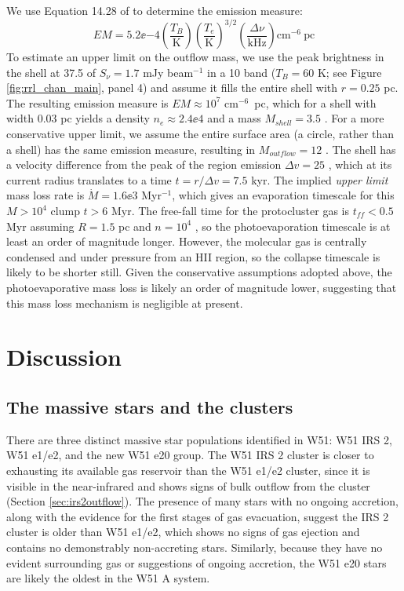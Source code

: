 We use Equation 14.28 of \citet{Wilson2009a} to determine the emission measure:
\begin{equation}
    EM = 5.2\ee{-4} 
    \left(\frac{T_B}{\mathrm{K}}\right)
    \left(\frac{T_e}{\mathrm{K}}\right)^{3/2} \left(\frac{\Delta
    \nu}{\mathrm{kHz}}\right) \mathrm{cm}^{-6}\mathrm{~pc}
\end{equation}
To estimate an upper limit on the outflow mass, we use the peak brightness in the shell at 37.5
\kms of $S_\nu=1.7$ mJy beam$^{-1}$ in a 10 \kms band ($T_B=60$ K;
 see Figure
\ref{fig:rrl_chan_main}, panel 4) and assume it fills the entire shell with
$r=0.25$ pc.  The resulting emission measure is $EM\approx10^7$ cm$^{-6}$~pc,
which for a shell with width 0.03 pc yields a density $n_e\approx2.4\ee{4}$
\percc and a mass $M_{shell}=3.5$ \msun.  For a more conservative upper limit,
we assume the entire surface area (a circle, rather than a shell) has the same
emission measure, resulting in $M_{outflow}=12$ \msun.  The shell has a velocity
difference from the peak of the \hii region emission $\Delta v=25$ \kms, which
at its current radius translates to a time $t = r / \Delta v = 7.5$ kyr.
The implied \emph{upper limit} mass loss rate is $\dot{M} = 1.6\ee{3}$ \msun
Myr$^{-1}$, which gives an evaporation timescale for this $M>10^4$ \msun
clump $t>6$ Myr.  The free-fall time for the protocluster gas is $t_{ff} < 0.5$ Myr
assuming $R=1.5$ pc and $n=10^4$ \percc, so the photoevaporation timescale is
at least an order of magnitude longer.  However, the molecular gas is centrally
condensed and under pressure from an HII region, so the collapse timescale is
likely to be shorter still.
Given the conservative assumptions adopted above, the photoevaporative mass
loss is likely an order of magnitude lower, suggesting that this mass loss
mechanism is negligible at present.


\section{Discussion}
\label{sec:discussion}

\subsection{The massive stars and the clusters}
\label{sec:mstarscluster}
There are three distinct massive star populations identified in W51: W51 IRS 2,
W51 e1/e2, and the new W51 e20 group.  The W51 IRS 2 cluster is closer to
exhausting its available gas reservoir than the W51 e1/e2 cluster, since it is
visible in the near-infrared and shows signs of bulk outflow from the cluster
(Section \ref{sec:irs2outflow}).  The presence of many stars with no ongoing
accretion, along with the evidence for the first stages of gas evacuation,
suggest the IRS 2 cluster is older than W51 e1/e2, which shows no signs
of gas ejection and contains no demonstrably non-accreting stars.  Similarly,
because they have no evident surrounding gas or suggestions of ongoing
accretion, the W51 e20 stars are likely the oldest in the W51 A
system.

